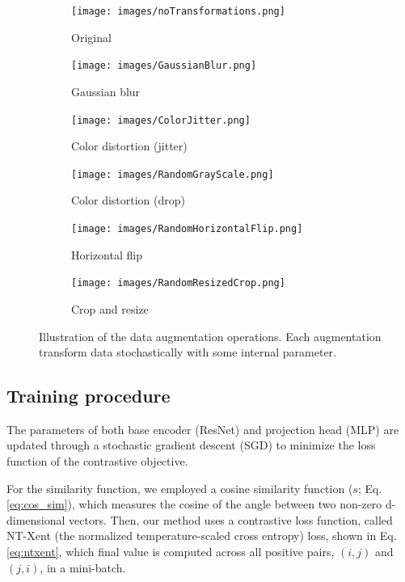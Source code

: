 \documentclass{article}
\begin{document}
\begin{figure}
  \begin{subfigure}[t]{0.33\textwidth}
    \centering
    \texttt{[image: images/noTransformations.png]}
    \caption{Original}
  \end{subfigure}
  \begin{subfigure}[t]{0.33\textwidth}
    \centering
    \texttt{[image: images/GaussianBlur.png]}
    \caption{Gaussian blur}
  \end{subfigure}
  \begin{subfigure}[t]{0.33\textwidth}
    \centering
    \texttt{[image: images/ColorJitter.png]}
    \caption{Color distortion (jitter)}
  \end{subfigure}
  \hfill
  \begin{subfigure}[t]{0.33\textwidth}
    \centering
    \texttt{[image: images/RandomGrayScale.png]}
    \caption{Color distortion (drop)}
  \end{subfigure}
  \begin{subfigure}[t]{0.33\textwidth}
    \centering
    \texttt{[image: images/RandomHorizontalFlip.png]}
    \caption{Horizontal flip}
  \end{subfigure}
  \begin{subfigure}[t]{0.33\textwidth}
    \centering
    \texttt{[image: images/RandomResizedCrop.png]}
    \caption{Crop and resize}
  \end{subfigure}
  \caption{Illustration of the data augmentation operations. Each augmentation transform data stochastically with some internal parameter.}
  \label{fig:exampleImage}
\end{figure}

\subsection{Training procedure}

The parameters of both base encoder (ResNet) and projection head (MLP) are updated through a stochastic gradient descent (SGD) to minimize the loss function of the contrastive objective.

For the similarity function, we employed a cosine similarity function ($s$; Eq. \ref{eq:cos_sim}), which measures the cosine of the angle between two non-zero d-dimensional vectors. Then, our method uses a contrastive loss function, called NT-Xent (the normalized temperature-scaled cross entropy) loss, shown in Eq. \ref{eq:ntxent}, which final value is computed across all positive pairs, $(i,j)$ and $(j,i)$, in a mini-batch.
\end{document}
